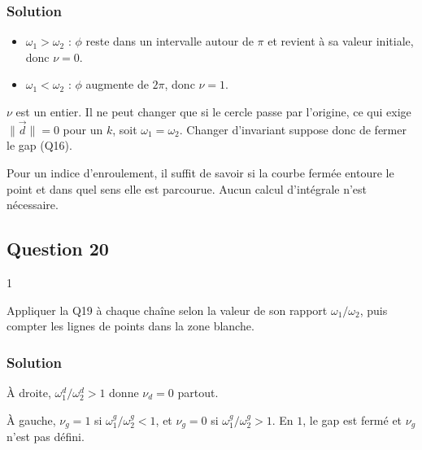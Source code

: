 \documentclass[11pt,a4paper]{article}
\providecommand{\tightlist}{\setlength{\itemsep}{0pt}\setlength{\parskip}{0pt}}
\begin{document}
\hypertarget{solution-27}{%
\subsubsection{Solution}\label{solution-27}}

\begin{itemize}
\tightlist
\item
  \(\omega_1>\omega_2\) : \(\phi\) reste dans un intervalle autour de \(\pi\) et revient à sa valeur initiale, donc \(\boxed{\nu=0}\).
\item
  \(\omega_1<\omega_2\) : \(\phi\) augmente de \(2\pi\), donc \(\boxed{\nu=1}\).
\end{itemize}

\(\nu\) est un entier. Il ne peut changer que si le cercle passe par l'origine, ce qui exige \(\lVert\vec d\rVert=0\) pour un \(k\), soit \(\omega_1=\omega_2\). Changer d'invariant suppose donc de fermer le gap (Q16).

\begin{methode}

Pour un indice d'enroulement, il suffit de savoir si la courbe fermée entoure le point et dans quel sens elle est parcourue. Aucun calcul d'intégrale n'est nécessaire.

\end{methode}

\hypertarget{question-20}{%
\subsection{Question 20}\label{question-20}}

\begin{indication}{1}

Appliquer la Q19 à chaque chaîne selon la valeur de son rapport \(\omega_1/\omega_2\), puis compter les lignes de points dans la zone blanche.

\end{indication}

\hypertarget{solution-28}{%
\subsubsection{Solution}\label{solution-28}}

À droite, \(\omega_1^d/\omega_2^d>1\) donne \(\boxed{\nu_d=0}\) partout.

À gauche, \(\nu_g=1\) si \(\omega_1^g/\omega_2^g<1\), et \(\nu_g=0\) si \(\omega_1^g/\omega_2^g>1\). En \(1\), le gap est fermé et \(\nu_g\) n'est pas défini.
\end{document}
